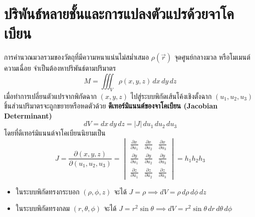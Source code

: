 \section{ปริพันธ์หลายชั้นและการแปลงตัวแปรด้วยจาโคเบียน}
การคำนวณมวลรวมของวัตถุที่มีความหนาแน่นไม่สม่ำเสมอ $\rho(\vec{r})$ จุดศูนย์กลางมวล หรือโมเมนต์ความเฉื่อย จำเป็นต้องหาปริพันธ์ตามปริมาตร
\begin{equation}
M = \iiint_V \rho(x, y, z) \, dx\,dy\,dz
\end{equation}
เมื่อทำการเปลี่ยนตัวแปรจากพิกัดฉาก $(x, y, z)$ ไปสู่ระบบพิกัดเส้นโค้งเชิงตั้งฉาก $(u_1, u_2, u_3)$ ชิ้นส่วนปริมาตรจะถูกขยายหรือหดตัวด้วย \textbf{ดีเทอร์มิแนนต์ของจาโคเบียน (Jacobian Determinant)}
\begin{equation}
dV = dx\,dy\,dz = |J| \, du_1\,du_2\,du_3
\end{equation}
โดยที่ดีเทอร์มิแนนต์จาโคเบียนนิยามเป็น
\begin{equation}
J = \frac{\partial(x, y, z)}{\partial(u_1, u_2, u_3)} = \begin{vmatrix}
\frac{\partial x}{\partial u_1} & \frac{\partial x}{\partial u_2} & \frac{\partial x}{\partial u_3} \\
\frac{\partial y}{\partial u_1} & \frac{\partial y}{\partial u_2} & \frac{\partial y}{\partial u_3} \\
\frac{\partial z}{\partial u_1} & \frac{\partial z}{\partial u_2} & \frac{\partial z}{\partial u_3}
\end{vmatrix} = h_1 h_2 h_3
\end{equation}
\begin{itemize}
    \item ในระบบพิกัดทรงกระบอก $(\rho, \phi, z)$ จะได้ $J = \rho \implies dV = \rho \, d\rho \, d\phi \, dz$
    \item ในระบบพิกัดทรงกลม $(r, \theta, \phi)$ จะได้ $J = r^2\sin\theta \implies dV = r^2\sin\theta \, dr \, d\theta \, d\phi$
\end{itemize}

